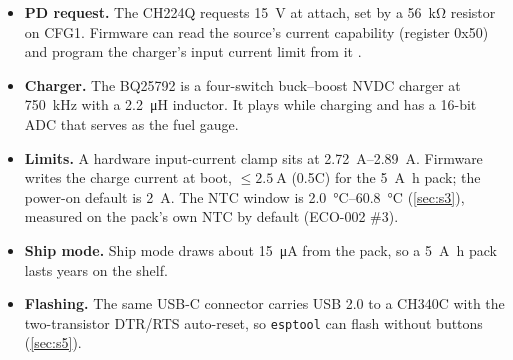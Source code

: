 \begin{itemize}
  \item \textbf{PD request.} The CH224Q requests \qty{15}{\volt} at attach, set by a \qty{56}{\kilo\ohm} resistor on CFG1. Firmware can read the source's current capability (register 0x50) and program the charger's input current limit from it .
  \item \textbf{Charger.} The BQ25792 is a four-switch buck--boost NVDC charger at \qty{750}{\kilo\hertz} with a \qty{2.2}{\micro\henry} inductor. It plays while charging and has a 16-bit ADC that serves as the fuel gauge.
  \item \textbf{Limits.} A hardware input-current clamp sits at \qtyrange{2.72}{2.89}{\ampere}. Firmware writes the charge current at boot, $\le\qty{2.5}{\ampere}$ (0.5C) for the \qty{5}{\ampere\hour} pack; the power-on default is \qty{2}{\ampere}. The NTC window is \qtyrange{2.0}{60.8}{\degreeCelsius} (\cref{sec:s3}), measured on the pack's own NTC by default (ECO-002 \#3).
  \item \textbf{Ship mode.} Ship mode draws about \qty{15}{\micro\ampere} from the pack, so a \qty{5}{\ampere\hour} pack lasts years on the shelf.
  \item \textbf{Flashing.} The same USB-C connector carries USB 2.0 to a CH340C with the two-transistor DTR/RTS auto-reset, so \texttt{esptool} can flash without buttons (\cref{sec:s5}).
\end{itemize}

